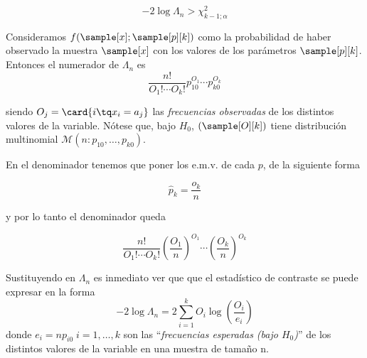 \documentclass{apuntes}
\begin{document}
\[ - 2 \log \Lambda_n > \chi_{k-1;\alpha}^2 \]

Consideramos $f(\sample[x];\sample[p][k])$ como la probabilidad de haber observado la muestra $\sample[x]$ con los valores de los parámetros $\sample[p][k]$.\\
Entonces el numerador de $\Lambda_n$ es
\[ \frac{n!}{O_1!\dotsb O_k!}p_{10}^{O_1}\dotsb p_{k0}^{O_k} \]

siendo $ O_j=\card{i\tq x_i = a_j}$ las \textit{frecuencias observadas} de los distintos valores de la variable. Nótese que, bajo $H_0$, $(\sample[O][k])$ tiene distribución multinomial $\mathcal{M}(n:p_{10},\dotsc , p_{k0})$.

En el denominador tenemos que poner los e.m.v. de cada $p$, de la siguiente forma

\[ \hat{p}_k = \frac{o_k}{n} \]

y por lo tanto el denominador queda

\[ \frac{n!}{O_1!\dotsb O_k!} \left(\frac{O_1}{n}\right)^{O_1} \dotsb \left(\frac{O_k}{n}\right)^{O_k} \]

Sustituyendo en $\Lambda_n$ es inmediato ver que que el estadístico de contraste se puede expresar en la forma
\[
-2 \log \Lambda_n =
2 \sum\limits_{i=1}^{k} O_i\log{\left(\frac{O_i}{e_i}\right)}
\]
donde $e_i = np_{i0} \; i=1,\dotsc,k$ son las ``\textit{frecuencias esperadas (bajo $H_0$)}'' de los distintos valores de la variable en una muestra de tamaño n.
\end{document}
